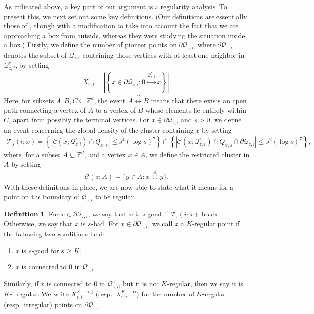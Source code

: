 \documentclass[11pt]{article}
\theoremstyle{definition}
\theoremstyle{remark}
\newcommand{\Z}{\mathbb{Z}}
\numberwithin{equation}{section}
\theoremstyle{plain}
\theoremstyle{definition}
\newtheorem{defn}[theorem]{Definition}
\theoremstyle{remark}
\theoremstyle{plain}
\begin{document}
As indicated above, a key part of our argument is a regularity analysis. To present this, we next set out some key definitions. (Our definitions are essentially those of \cite{ASS}, though with a modification to take into account the fact that we are approaching a box from outside, whereas they were studying the situation inside a box.) Firstly, we define the number of pioneer points on $\partial \mathcal Q_{z,i}$, where $\partial \mathcal Q_{z,i}$ denotes the subset of $\mathcal Q_{z,i}$ containing those vertices with at least one neighbor in $\mathcal Q_{z,i}^c$, by setting
\begin{align*}
    X_{r,i}=\left|\left\{x \in \partial \mathcal Q_{z,i}: 0 \overset{\mathcal Q_{z, i}^c}{\longleftrightarrow} x \right\}\right|.
\end{align*}
Here, for subsets $A,B, C \subseteq \Z^d$, the event $A \overset{C}{\longleftrightarrow} B$ means that there exists an open path connecting a vertex of $A$ to a vertex of $B$ whose elements lie entirely within $C$, apart from possibly the terminal vertices. For $x \in \partial \mathcal Q_{z, i}$ and $s>0$, we define an event concerning the global density of the cluster containing $x$ by setting
\begin{align*}
\mathcal T_{s}(i;x)=\left\{\left|\mathcal C(x; \mathcal Q_{z,i}^c)\cap Q_{x,s}\right|\le s^4(\log s)^7\right\}\cap \left\{\left|\mathcal C(x; \mathcal Q_{z,i}^c)\cap Q_{x,s}\cap \partial \mathcal Q_{z,i}\right|\le s^2(\log s)^7\right\},
\end{align*}
where, for a subset $A \subseteq \Z^d$, and a vertex $x \in A$, we define the restricted cluster in $A$ by setting
\begin{align*}
 \mathcal C(x; A)=\{y \in A: x \overset{A}{\longleftrightarrow} y \}.
\end{align*}
With these definitions in place, we are now able to state what it means for a point on the boundary of $\mathcal Q_{z,i}$ to be regular.

\begin{defn}\label{def:Kreg}
For $x \in \partial \mathcal Q_{z, i}$, we say that $x$ is $s$-good if $\mathcal T_{s}(i;x)$ holds. Otherwise, we say that $x$ is $s$-bad. For $x \in \partial \mathcal Q_{z, i}$, we call $x$ a $K$-regular point if the following two conditions hold:
\begin{enumerate}
\item $x$ is $s$-good for $s\ge K$;
\item $x$ is connected to $0$ in $\mathcal Q_{z, i}^c$.
\end{enumerate}
Similarly, if $x$ is connected to $0$ in $\mathcal Q_{z, i}^c$, but it is not $K$-regular, then we say it is $K$-irregular. We write $X_{r,i}^{K-\mathrm{reg}}$ (resp.\ $X_{r,i}^{K-\mathrm{irr}}$) for the number of $K$-regular (resp.\ irregular) points on $\partial \mathcal Q_{z, i}$.
\end{defn}
\end{document}
